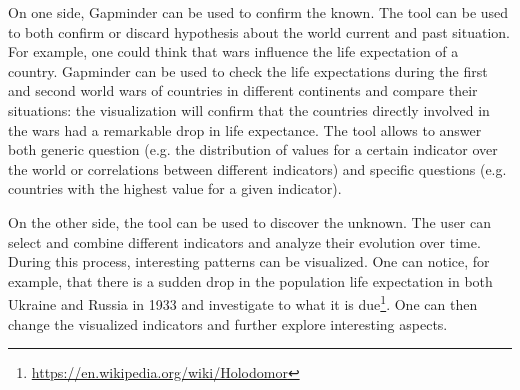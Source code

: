 On one side, Gapminder can be used to confirm the known.
The tool can be used to both confirm or discard hypothesis about the world current and past situation.
For example, one could think that wars influence the life expectation of a country.
Gapminder can be used to check the life expectations during the first and second world wars of countries in different continents and compare their situations:
the visualization will confirm that the countries directly involved in the wars had a remarkable drop in life expectance.
The tool allows to answer both generic question (e.g. the distribution of values for a certain indicator over the world or correlations between different indicators) and specific questions (e.g. countries with the highest value for a given indicator).

On the other side, the tool can be used to discover the unknown.
The user can select and combine different indicators and analyze their evolution over time.
During this process, interesting patterns can be visualized.
One can notice, for example, that there is a sudden drop in the population life expectation in both Ukraine and Russia in 1933 and investigate to what it is due\footnote{\url{https://en.wikipedia.org/wiki/Holodomor}}.
One can then change the visualized indicators and further explore interesting aspects.
